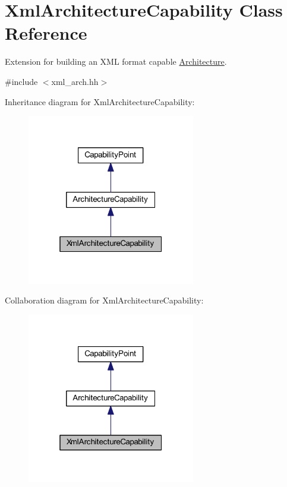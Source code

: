 \hypertarget{class_xml_architecture_capability}{}\section{Xml\+Architecture\+Capability Class Reference}
\label{class_xml_architecture_capability}


Extension for building an X\+ML format capable \mbox{\hyperlink{class_architecture}{Architecture}}.  




{\ttfamily \#include $<$xml\+\_\+arch.\+hh$>$}



Inheritance diagram for Xml\+Architecture\+Capability\+:
\nopagebreak
\begin{figure}[H]
\begin{center}
\leavevmode
\includegraphics[width=208pt]{class_xml_architecture_capability__inherit__graph}
\end{center}
\end{figure}


Collaboration diagram for Xml\+Architecture\+Capability\+:
\nopagebreak
\begin{figure}[H]
\begin{center}
\leavevmode
\includegraphics[width=208pt]{class_xml_architecture_capability__coll__graph}
\end{center}
\end{figure}
